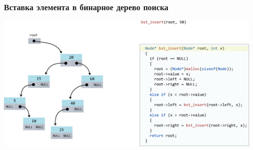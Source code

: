 \documentclass[10pt,pdf,hyperref={unicode}]{beamer}
\begin{document}
\begin{frame}[fragile]
\frametitle{Вставка элемента в бинарное дерево поиска}
\begin{center}
\includegraphics[scale=0.6]{images/tree/codetree/codetree1.png}
\end{center}
\end{frame}
\end{document}

